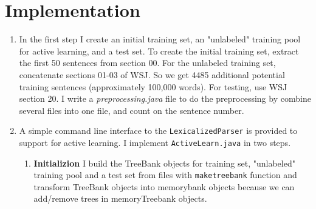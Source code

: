 \documentclass[winfonts,UTF8]{article}
\begin{document}
\section{Implementation}
\begin{enumerate}

\item In the first step I create an initial training set, an "unlabeled" training pool for active learning, and a test set. To create the initial training set, extract the first 50 sentences from section 00. For the unlabeled training set, concatenate sections 01-03 of WSJ. So we get 4485 additional potential training sentences (approximately 100,000 words). For testing, use WSJ section 20. I write a \emph{preprocessing.java} file to do the preprocessing by combine several files into one file, and count on the sentence number.

\item A simple command line interface to the {\tt{LexicalizedParser}} is provided to support for active learning. I implement {\tt ActiveLearn.java} in two steps.
\begin{enumerate}
\item \textbf{Initializion} I build the TreeBank objects for training set, "unlabeled" training pool and a test set from files with {\tt maketreebank} function and transform TreeBank objects into memorybank objects because we can add/remove trees in memoryTreebank objects.


\end{enumerate}
\end{enumerate}
\end{document}
